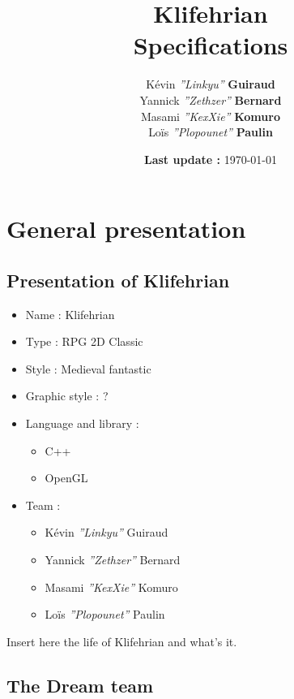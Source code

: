 \documentclass[a4paper,12pt]{book}
\title{\Huge{Klifehrian} \\ \large{Specifications}}
\author{K\'{e}vin \textit{''Linkyu''} \textbf{Guiraud} \\ Yannick \textit{''Zethzer''} \textbf{Bernard} \\ Masami \textit{''KexXie''} \textbf{Komuro} \\ Lo\"{i}s \textit{''Plopounet''} \textbf{Paulin}}
\date{\textbf{Last update :} \today}
\begin{document}
\maketitle
\thispagestyle{empty}
\setcounter{page}{0}
\part{General presentation}
\chapter{Presentation of Klifehrian}
\begin{itemize}
\item Name : Klifehrian
\item Type : RPG 2D Classic
\item Style : Medieval fantastic
\item Graphic style : ?
\item Language and library :
\begin{itemize}
\item C++
\item OpenGL
\end{itemize}
\item Team :
\begin{itemize}
\item K\'{e}vin \textit{''Linkyu''} Guiraud
\item Yannick \textit{''Zethzer''} Bernard
\item Masami \textit{''KexXie''} Komuro
\item Lo\"{i}s \textit{''Plopounet''} Paulin
\end{itemize}
\end{itemize}
Insert here the life of Klifehrian and what's it.
\chapter{The Dream team}
\end{document}
